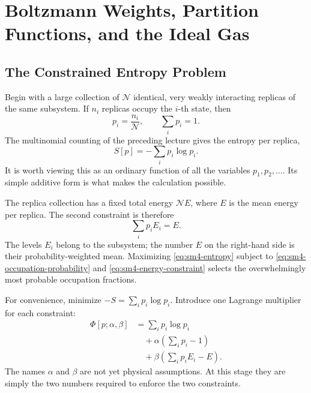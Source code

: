 \chapter{Boltzmann Weights, Partition Functions, and the Ideal Gas}


\section{The Constrained Entropy Problem}

Begin with a large collection of \(\mathcal N\) identical, very weakly
interacting replicas of the same subsystem.  If \(n_i\) replicas occupy the
\(i\)-th state, then
\begin{equation}
 p_i=\frac{n_i}{\mathcal N},
 \qquad
 \sum_i p_i=1.
 \label{eq:sm4-occupation-probability}
\end{equation}
The multinomial counting of the preceding lecture gives the entropy per
replica,
\begin{equation}
 S[p]=-\sum_i p_i\log p_i.
 \label{eq:sm4-entropy}
\end{equation}
It is worth viewing this as an ordinary function of all the variables
\(p_1,p_2,\ldots\).  Its simple additive form is what makes the calculation
possible.

The replica collection has a fixed total energy \(\mathcal N E\), where
\(E\) is the mean energy per replica.  The second constraint is therefore
\begin{equation}
 \sum_i p_iE_i=E.
 \label{eq:sm4-energy-constraint}
\end{equation}
The levels \(E_i\) belong to the subsystem; the number \(E\) on the
right-hand side is their probability-weighted mean.  Maximizing
\eqref{eq:sm4-entropy} subject to
\eqref{eq:sm4-occupation-probability} and
\eqref{eq:sm4-energy-constraint} selects the overwhelmingly most probable
occupation fractions.

For convenience, minimize \(-S=\sum_i p_i\log p_i\).  Introduce one
Lagrange multiplier for each constraint:
\begin{equation}
 \begin{aligned}
 \Phi[p;\alpha,\beta]
 &=\sum_i p_i\log p_i\\
 &\quad+\alpha\left(\sum_i p_i-1\right)\\
 &\quad+\beta\left(\sum_i p_iE_i-E\right).
 \end{aligned}
 \label{eq:sm4-augmented-functional}
\end{equation}
The names \(\alpha\) and \(\beta\) are not yet physical assumptions.  At
this stage they are simply the two numbers required to enforce the two
constraints.

